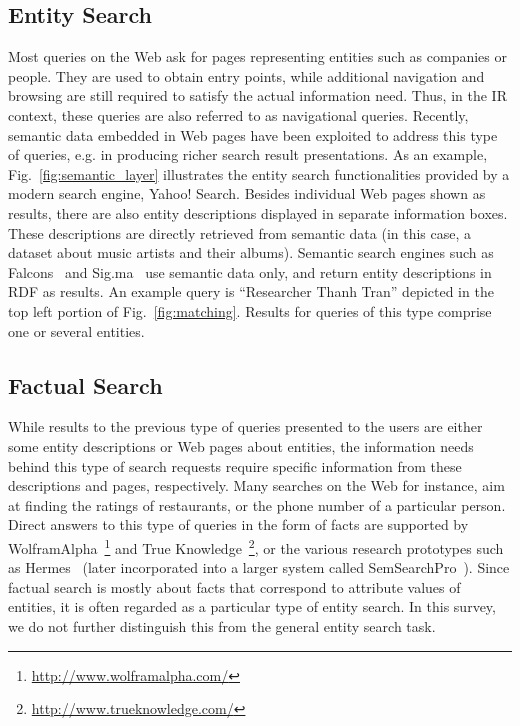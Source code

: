 \subsection{Entity Search} Most queries on the Web ask for pages representing entities such as companies or people. They are used to obtain entry points, while additional navigation and browsing are still required to satisfy the actual information need. Thus, in the IR context, these queries are also referred to as navigational queries. Recently, semantic data embedded in Web pages have been exploited to address this type of queries, e.g. in producing richer search result presentations. As an example, Fig.~\ref{fig:semantic_layer} illustrates the entity search functionalities provided by a modern search engine, Yahoo! Search. Besides individual Web pages shown as results, there are also entity descriptions displayed in separate information boxes. These descriptions are directly retrieved from semantic data (in this case, a dataset about music artists and their albums). 
Semantic search engines such as Falcons~\cite{DBLP:journals/ijswis/ChengQ09} and Sig.ma~\cite{DBLP:journals/ws/TummarelloCCDDD10} use semantic data only, and return entity descriptions in RDF as results. An example 
query is ``Researcher Thanh Tran'' depicted in the top left portion of Fig.~\ref{fig:matching}. Results for queries of this type comprise one or several entities. 
	 
\subsection{Factual Search} While results to the previous type of queries presented to the users are either some entity descriptions or Web pages about entities, the information needs behind this type of search requests require specific information from these descriptions and pages, respectively. Many searches on the Web for instance, aim at finding the ratings of restaurants, or the phone number of a particular person. 
Direct answers to this type of queries in the form of facts are supported by WolframAlpha~\footnote{\url{http://www.wolframalpha.com/}} and True Knowledge~\footnote{\url{http://www.trueknowledge.com/}}, or the various research prototypes such as Hermes~\cite{DBLP:journals/ws/TranWH09} (later incorporated into a larger system called SemSearchPro~\cite{DBLP:journals/ws/TranHL11}). 
Since factual search is mostly about facts that correspond to attribute values of entities, it is often regarded as a particular type of entity search. In this survey, we do not further distinguish this from the general entity search task. 
 
